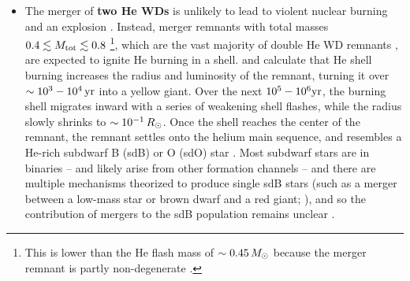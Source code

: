 \begin{itemize}
	\item The merger of {\bf two He WDs} is unlikely to lead to violent nuclear burning and an explosion \citep{dan+12,dan+14,dan+15}.  Instead, merger remnants with total masses $0.4\lesssim \Mtot \lesssim 0.8$ \citep{han+02,ibent85}\footnote{This is lower than the He flash mass of $\sim0.45\,\Msun$ because the merger remnant is partly non-degenerate \citep{ibent85, han+02}.}, which are the vast majority of double He WD remnants \citep{nele10}, are expected to ignite He burning in a shell.  \cite{saioj00} and \cite{zhanj12} calculate that He shell burning increases the radius and luminosity of the remnant, turning it over $\sim 10^3-10^4\,\mathrm{yr}$ into a yellow giant.  Over the next $10^5-10^6\mathrm{yr}$, the burning shell migrates inward with a series of weakening shell flashes, while the radius slowly shrinks to $\sim10^{-1}\,\Rsun$.  Once the shell reaches the center of the remnant, the remnant settles onto the helium main sequence, and resembles a He-rich subdwarf B (sdB) or O (sdO) star \citep{saioj00, justph11, zhanj12, hebe16}.  Most subdwarf stars are in binaries -- and likely arise from other formation channels -- and there are multiple mechanisms theorized to produce single sdB stars (such as a merger between a low-mass star or brown dwarf and a red giant; \citealt{soke98}), and so the contribution of mergers to the sdB population remains unclear \citep{nele10, hebe16}.





\end{itemize}
